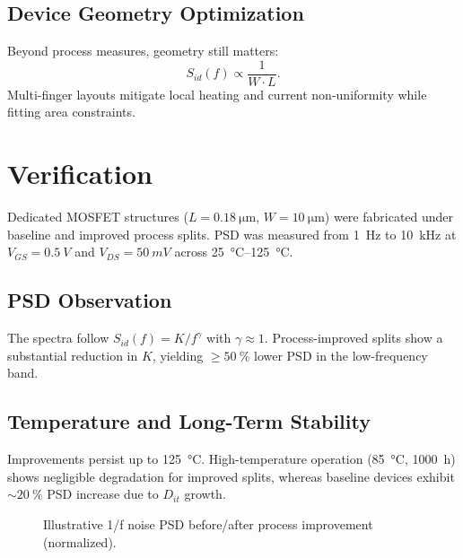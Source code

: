 \documentclass[conference]{IEEEtran}
\begin{document}
\subsection{Device Geometry Optimization}
Beyond process measures, geometry still matters:
\begin{equation}
S_{id}(f) \propto \frac{1}{W\cdot L}.
\end{equation}
Multi-finger layouts mitigate local heating and current non-uniformity while fitting area constraints.

\section{Verification}
Dedicated MOSFET structures ($L=\SI{0.18}{\micro\meter}$, $W=\SI{10}{\micro\meter}$) were fabricated under baseline and improved process splits. PSD was measured from \SI{1}{Hz} to \SI{10}{kHz} at $V_{GS}=\SI{0.5}{V}$ and $V_{DS}=\SI{50}{mV}$ across \SI{25}{\celsius}--\SI{125}{\celsius}.

\subsection{PSD Observation}
The spectra follow $S_{id}(f)=K/f^{\gamma}$ with $\gamma\approx 1$. Process-improved splits show a substantial reduction in $K$, yielding $\geq\SI{50}{\percent}$ lower PSD in the low-frequency band.

\subsection{Temperature and Long-Term Stability}
Improvements persist up to \SI{125}{\celsius}. High-temperature operation (\SI{85}{\celsius}, 1000~h) shows negligible degradation for improved splits, whereas baseline devices exhibit $\sim\SI{20}{\percent}$ PSD increase due to $D_{it}$ growth.

\begin{figure}[t]
\centering
{}
\caption{Illustrative 1/f noise PSD before/after process improvement (normalized).}
\label{fig:psd}
\end{figure}
\end{document}
